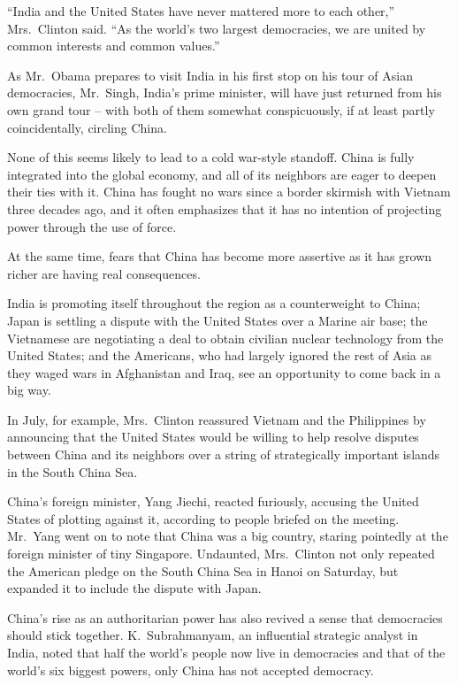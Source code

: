 ﻿\documentclass[12pt]{article}
\begin{document}
``India and the United States have never mattered more to each other,'' Mrs.~Clinton said. ``As the
world's two largest democracies, we are united by common interests and common values.''

As Mr.~Obama prepares to visit India in his first stop on his tour of Asian democracies, Mr.~Singh,
India's prime minister, will have just returned from his own grand tour -- with both of them
somewhat conspicuously, if at least partly coincidentally, circling China.

None of this seems likely to lead to a cold war-style standoff. China is fully integrated into the
global economy, and all of its neighbors are eager to deepen their ties with it. China has fought no
wars since a border skirmish with Vietnam three decades ago, and it often emphasizes that it has no
intention of projecting power through the use of force.

At the same time, fears that China has become more assertive as it has grown richer are having real
consequences.

India is promoting itself throughout the region as a counterweight to China; Japan is settling a
dispute with the United States over a Marine air base; the Vietnamese are negotiating a deal to
obtain civilian nuclear technology from the United States; and the Americans, who had largely
ignored the rest of Asia as they waged wars in Afghanistan and Iraq, see an opportunity to come back
in a big way.

In July, for example, Mrs.~Clinton reassured Vietnam and the Philippines by announcing that the
United States would be willing to help resolve disputes between China and its neighbors over a
string of strategically important islands in the South China Sea.

China's foreign minister, Yang Jiechi, reacted furiously, accusing the United States of plotting
against it, according to people briefed on the meeting. Mr.~Yang went on to note that China was a
big country, staring pointedly at the foreign minister of tiny Singapore. Undaunted, Mrs.~Clinton
not only repeated the American pledge on the South China Sea in Hanoi on Saturday, but expanded it
to include the dispute with Japan.

China's rise as an authoritarian power has also revived a sense that democracies should stick
together. K.~Subrahmanyam, an influential strategic analyst in India, noted that half the world's
people now live in democracies and that of the world's six biggest powers, only China has not
accepted democracy.
\end{document}
